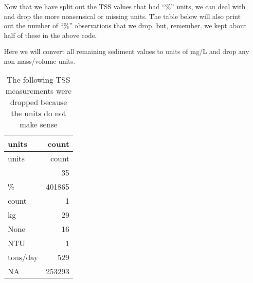 \documentclass[]{article}
\newenvironment{Shaded}{\begin{snugshade}}{\end{snugshade}}
\newcommand{\CommentTok}[1]{\textcolor[rgb]{0.56,0.35,0.01}{\textit{#1}}}
\newcommand{\DataTypeTok}[1]{\textcolor[rgb]{0.13,0.29,0.53}{#1}}
\newcommand{\DecValTok}[1]{\textcolor[rgb]{0.00,0.00,0.81}{#1}}
\newcommand{\KeywordTok}[1]{\textcolor[rgb]{0.13,0.29,0.53}{\textbf{#1}}}
\newcommand{\NormalTok}[1]{#1}
\newcommand{\OperatorTok}[1]{\textcolor[rgb]{0.81,0.36,0.00}{\textbf{#1}}}
\newcommand{\StringTok}[1]{\textcolor[rgb]{0.31,0.60,0.02}{#1}}
\begin{document}
Now that we have split out the TSS values that had ``\%'' units, we can
deal with and drop the more nonsensical or missing units. The table
below will also print out the number of ``\%'' observations that we
drop, but, remember, we kept about half of these in the above code.

Here we will convert all remaining sediment values to units of mg/L and
drop any non mass/volume units.

\begin{Shaded}
\end{Shaded}

\begin{longtable}[]{@{}lr@{}}
\caption{The following TSS measurements were dropped because the units
do not make sense}\tabularnewline
\toprule
units & count\tabularnewline
\midrule
\endfirsthead
\toprule
units & count\tabularnewline
\midrule
\endhead
& 35\tabularnewline
\% & 401865\tabularnewline
count & 1\tabularnewline
kg & 29\tabularnewline
None & 16\tabularnewline
NTU & 1\tabularnewline
tons/day & 529\tabularnewline
NA & 253293\tabularnewline
\bottomrule
\end{longtable}
\end{document}
